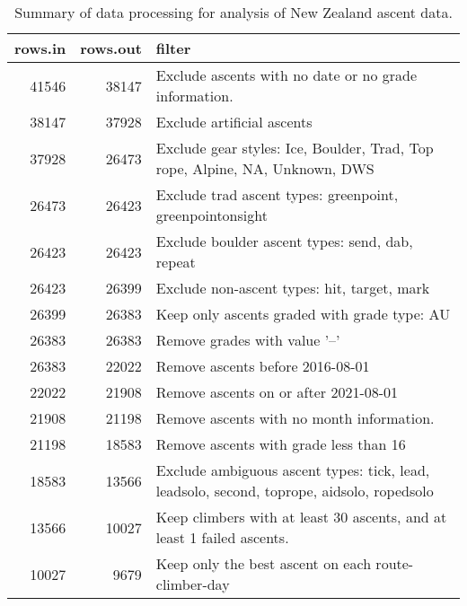 \begin{table}[ht]
\centering
\begingroup\fontsize{9pt}{10pt}\selectfont
\begin{tabular}{rrl}
  \hline
{\bf rows.in} & {\bf rows.out} & {\bf filter} \\ 
  \hline
41546 & 38147 & Exclude ascents with no date or no grade information. \\ 
  38147 & 37928 & Exclude artificial ascents \\ 
  37928 & 26473 & Exclude gear styles: Ice, Boulder, Trad, Top rope, Alpine, NA, Unknown, DWS \\ 
  26473 & 26423 & Exclude trad ascent types: greenpoint, greenpointonsight \\ 
  26423 & 26423 & Exclude boulder ascent types: send, dab, repeat \\ 
  26423 & 26399 & Exclude non-ascent types: hit, target, mark \\ 
  26399 & 26383 & Keep only ascents graded with grade type: AU \\ 
  26383 & 26383 & Remove grades with value '--' \\ 
  26383 & 22022 & Remove ascents before 2016-08-01 \\ 
  22022 & 21908 & Remove ascents on or after 2021-08-01 \\ 
  21908 & 21198 & Remove ascents with no month information. \\ 
  21198 & 18583 & Remove ascents with grade less than 16 \\ 
  18583 & 13566 & Exclude ambiguous ascent types: tick, lead, leadsolo, second, toprope, aidsolo, ropedsolo \\ 
  13566 & 10027 & Keep climbers with at least 30 ascents, and at least 1 failed ascents. \\ 
  10027 & 9679 & Keep only the best ascent on each route-climber-day \\ 
   \hline
\end{tabular}
\endgroup
\caption{Summary of data processing for analysis of New Zealand ascent data.} 
\label{table-data-processing-nz}
\end{table}
